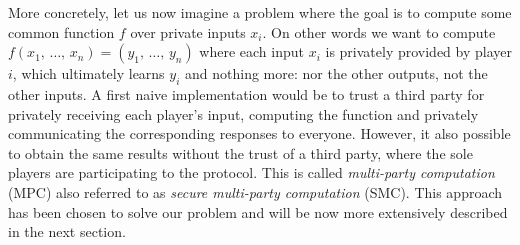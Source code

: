 More concretely, let us now imagine a problem where the goal is to compute some common function $f$ over private inputs $x_i$. On other words we want to compute $f\left(x_1, \, \ldots, \, x_n\right) = \left( y_1, \, \ldots , \, y_n\right)$ where each input $x_i$ is privately provided by player $i$, which ultimately learns $y_i$ and nothing more: nor the other outputs, not the other inputs. A first naive implementation would be to trust a third party for privately receiving each player's input, computing the function and privately communicating the corresponding responses to everyone. However, it also possible to obtain the same results without the trust of a third party, where the sole players are participating to the protocol. This is called \emph{multi-party computation} (MPC) also referred to as \emph{secure multi-party computation} (SMC). This approach has been chosen to solve our problem and will be now more extensively described in the next section.